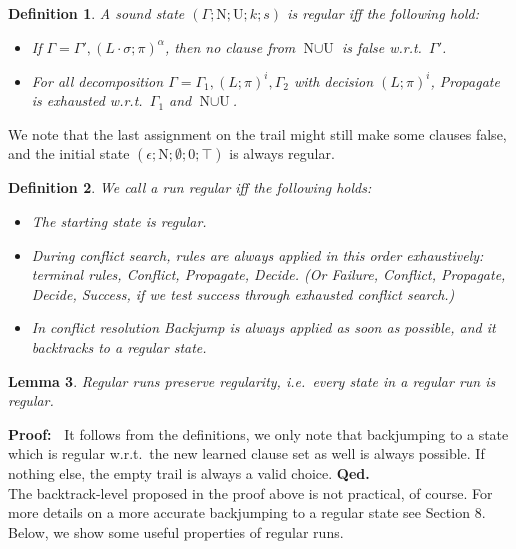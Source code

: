 \documentclass[a4paper]{article}
\newcommand{\startproof}{{\bf Proof:~}}
\newcommand{\finishproof}{{\bf Qed.}}
\newcommand{\leaveabit}{\\[6 pt]}
\newtheorem{defi}{Definition}[section]
\newtheorem{lemm}[defi]{Lemma}
\begin{document}
\begin{defi}\label{regStateDef}
A sound state $(\Gamma; \text{N}; \text{U}; k; s)$ is \emph{regular} iff the following hold:
	\begin{itemize}
		\item If $\Gamma = \Gamma', (L\cdot\sigma; \pi)^\alpha$, then no clause from $\text{N}\cup\text{U}$ is false w.r.t.\ $\Gamma'$.
		\item For all decomposition $\Gamma = \Gamma_1, (L; \pi)^i, \Gamma_2$ with decision $(L; \pi)^i$, \emph{Propagate} is exhausted w.r.t.\
			$\Gamma_1$ and $\text{N}\cup\text{U}$.
	\end{itemize}
\end{defi}
We note that the last assignment on the trail might still make some clauses false, and the initial state $(\epsilon; \text{N}; \emptyset; 0; \top)$ is always regular.
\begin{defi}\label{regRunDef}
We call a run \emph{regular} iff the following holds:
	\begin{itemize}
		\item The starting state is regular.
		\item During conflict search, rules are always applied in this order exhaustively: terminal rules, \emph{Conflict}, \emph{Propagate}, \emph{Decide}.
		(Or \emph{Failure}, \emph{Conflict}, \emph{Propagate}, \emph{Decide}, \emph{Success}, if we test success through exhausted conflict search.)
		\item In conflict resolution \emph{Backjump} is always applied as soon as possible, and it backtracks to a regular state.
	\end{itemize}
\end{defi}
\begin{lemm} Regular runs preserve regularity, i.e.\ every state in a regular run is regular.
\end{lemm}
\startproof
It follows from the definitions, we only note that backjumping to a state which is regular w.r.t.\
the new learned clause set as well is always possible.
If nothing else, the empty trail is always a valid choice. 
\finishproof\leaveabit
\noindent
The backtrack-level proposed in the proof above is not practical, of course.
For more details on a more accurate backjumping to a regular state see Section 8.\leaveabit\noindent
Below, we show some useful properties of regular runs.
\end{document}
